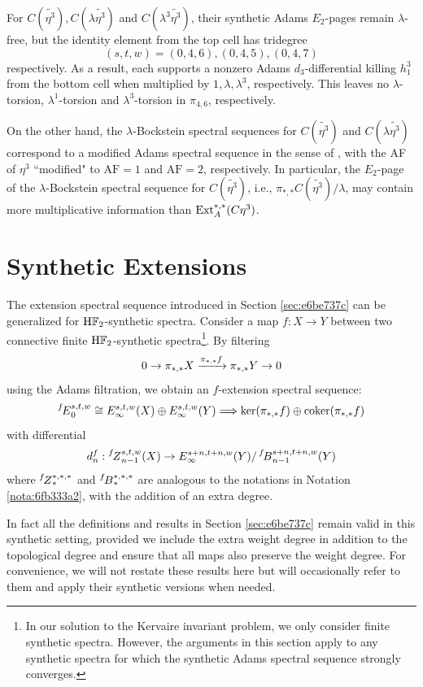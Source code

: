 \documentclass{amsart}
\numberwithin{equation}{section}
\newcommand{\AF}{\mathrm{AF}}
\newcommand{\ESS}[1]{\prescript{#1\!}{}{E}}
\newcommand{\ZESS}[1]{\prescript{#1\!}{}{Z}}
\newcommand{\BESS}[1]{\prescript{#1\!}{}{B}}
\newcommand{\HF}{\mathrm{H}\bF_2}
\begin{document}
\begin{remark}
    For $C(\tilde{\eta^3}), C(\lambda\tilde{\eta^3})$ and $C(\lambda^3\tilde{\eta^3})$, their synthetic Adams $E_2$-pages remain $\lambda$-free, but the identity element from the top cell has tridegree 
    $$(s,t,w) =(0,4,6), (0,4,5), (0,4,7)$$ 
    respectively. As a result, each supports a nonzero Adams $d_3$-differential killing $h_1^3$ from the bottom cell when multiplied by $1, \lambda, \lambda^3$, respectively. This leaves no $\lambda$-torsion, $\lambda^1$-torsion and $\lambda^3$-torsion in $\pi_{4,6}$, respectively.

    On the other hand, the $\lambda$-Bockstein spectral sequences for $C(\tilde{\eta^3})$ and $ C(\lambda\tilde{\eta^3})$ correspond to a modified Adams spectral sequence in the sense of \cite[Section 3]{BHHM}, with the AF of $\eta^3$ ``modified" to $\AF=1$ and $\AF=2$, respectively. In particular, the $E_2$-page of the $\lambda$-Bockstein spectral sequence for $C(\tilde{\eta^3})$, i.e., $\pi_{*,*}C(\tilde{\eta^3})/\lambda$, may contain more multiplicative information than $\mathrm{Ext}_A^{*,*}(C\eta^3)$. 
    
    
    
    
   
\end{remark}

\section{Synthetic Extensions} \label{sec:synext}
The extension spectral sequence introduced in Section \ref{sec:e6be737c} can be generalized for $\HF$-synthetic spectra. Consider a map $f: X\to Y$ between two connective finite $\HF$-synthetic spectra\footnote{In our solution to the Kervaire invariant problem, we only consider finite synthetic spectra. However, the arguments in this section apply to any synthetic spectra for which the synthetic Adams spectral sequence strongly converges.}. By filtering
$$0\to \pi_{*,*}X\xrightarrow{\pi_{*,*}f} \pi_{*,*}Y\to 0$$
using the Adams filtration, we obtain an $f$-extension spectral sequence:
$$\ESS{f}_0^{s,t,w} \cong E_\infty^{s,t,w}(X) \oplus E_\infty^{s,t,w}(Y) \Longrightarrow \Ker(\pi_{*,*}f)\oplus \Coker(\pi_{*,*}f)$$
with differential
$$d_n^f: \ZESS{f}_{n-1}^{s,t,w}(X)\to E_\infty^{s+n,t+n,w}(Y)/\BESS{f}_{n-1}^{s+n,t+n,w}(Y)$$
where $\ZESS{f}_*^{*,*,*}$ and $\BESS{f}_*^{*,*,*}$ are  analogous to the notations in Notation \ref{nota:6fb333a2}, with the addition of an extra degree.

In fact all the definitions and results in Section \ref{sec:e6be737c} remain valid in this synthetic setting, provided we include the extra weight degree in addition to the topological degree and ensure that all maps also preserve the weight degree. For convenience, we will not restate these results here but will occasionally refer to them and apply their synthetic versions when needed.
\end{document}
